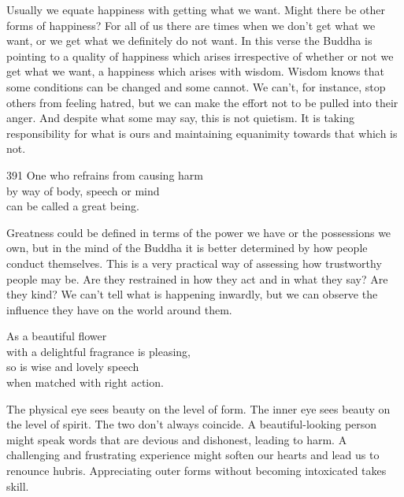 \begin{dhpRefl}
  Usually we equate happiness with getting what we want. Might there be other
  forms of happiness? For all of us there are times when we don’t get what we
  want, or we get what we definitely do not want. In this verse the Buddha is
  pointing to a quality of happiness which arises irrespective of whether or not
  we get what we want, a happiness which arises with wisdom. Wisdom knows that
  some conditions can be changed and some cannot. We can’t, for instance, stop
  others from feeling hatred, but we can make the effort not to be pulled into
  their anger. And despite what some may say, this is not quietism. It is taking
  responsibility for what is ours and maintaining equanimity towards that which
  is not.
\end{dhpRefl}


\begin{dhpVerse}{391}
\label{dhp-391}
One who refrains from causing harm\\
by way of body, speech or mind\\
can be called a great being.
\end{dhpVerse}

\begin{dhpRefl}
  Greatness could be defined in terms of the power we have or the possessions we
  own, but in the mind of the Buddha it is better determined by how people
  conduct themselves. This is a very practical way of assessing how trustworthy
  people may be. Are they restrained in how they act and in what they say? Are
  they kind? We can’t tell what is happening inwardly, but we can observe the
  influence they have on the world around them.
\end{dhpRefl}


\begin{dhpVerse}{52}
\label{dhp-52}
As a beautiful flower\\
with a delightful fragrance is pleasing,\\
so is wise and lovely speech\\
when matched with right action.
\end{dhpVerse}

\begin{dhpRefl}
  The physical eye sees beauty on the level of form. The inner eye sees beauty
  on the level of spirit. The two don’t always coincide. A beautiful-looking
  person might speak words that are devious and dishonest, leading to harm. A
  challenging and frustrating experience might soften our hearts and lead us to
  renounce hubris. Appreciating outer forms without becoming intoxicated takes
  skill.
\end{dhpRefl}

